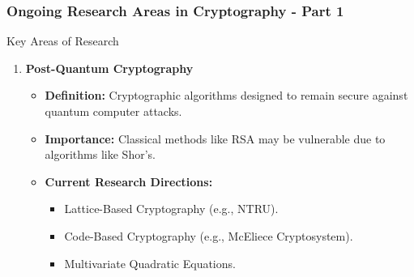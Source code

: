 \documentclass{beamer}
\begin{document}
\begin{frame}[fragile]
    \frametitle{Ongoing Research Areas in Cryptography - Part 1}
    \begin{block}{Key Areas of Research}
        \begin{enumerate}
            \item \textbf{Post-Quantum Cryptography}
            \begin{itemize}
                \item \textbf{Definition:} Cryptographic algorithms designed to remain secure against quantum computer attacks.
                \item \textbf{Importance:} Classical methods like RSA may be vulnerable due to algorithms like Shor's.
                \item \textbf{Current Research Directions:}
                \begin{itemize}
                    \item Lattice-Based Cryptography (e.g., NTRU).
                    \item Code-Based Cryptography (e.g., McEliece Cryptosystem).
                    \item Multivariate Quadratic Equations.
                \end{itemize}
            \end{itemize}
        \end{enumerate}
    \end{block}
\end{frame}
\end{document}

